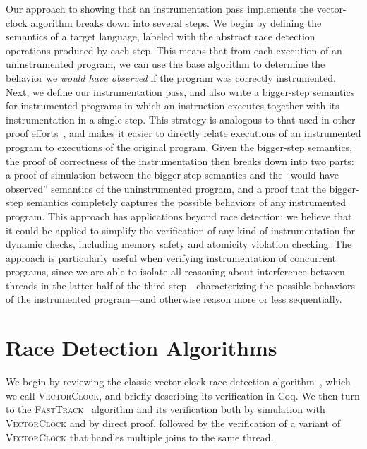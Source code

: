 \documentclass[preprint, 9pt]{sigplanconf}
\newcommand{\VCalg}{\textsc{VectorClock}\xspace}
\newcommand{\FT}{\textsc{FastTrack}\xspace}
\begin{document}
Our approach to showing that an instrumentation pass implements the vector-clock algorithm breaks down into several steps. We begin by defining the semantics of a target language, labeled with the abstract race detection operations produced by each step. This means that from each execution of an uninstrumented program, we can use the base algorithm to determine the behavior we \emph{would have observed} if the program was correctly instrumented. Next, we define our instrumentation pass, and also write a bigger-step semantics for instrumented programs in which an instruction executes together with its instrumentation in a single step. This strategy is analogous to that used in other proof efforts~\cite{softbound}, and makes it easier to directly relate executions of an instrumented program to executions of the original program. Given the bigger-step semantics, the proof of correctness of the instrumentation then breaks down into two parts: a proof of simulation between the bigger-step semantics and the ``would have observed'' semantics of the uninstrumented program, and a proof that the bigger-step semantics completely captures the possible behaviors of any instrumented program. This approach has applications beyond race detection: we believe that it could be applied to simplify the verification of any kind of instrumentation for dynamic checks, including memory safety and atomicity violation checking. The approach is particularly useful when verifying instrumentation of concurrent programs, since we are able to isolate all reasoning about interference between threads in the latter half of the third step---characterizing the possible behaviors of the instrumented program---and otherwise reason more or less sequentially.

\section{Race Detection Algorithms}
\label{algorithms}
We begin by reviewing the classic vector-clock race detection algorithm~\cite{vcmattern, vcfidge}, which we call \VCalg, and briefly describing its verification in Coq. We then turn to the \FT~\cite{fasttrack} algorithm and its verification both by simulation with \VCalg and by direct proof, followed by the verification of a variant of \VCalg that handles multiple joins to the same thread.

\end{document}
